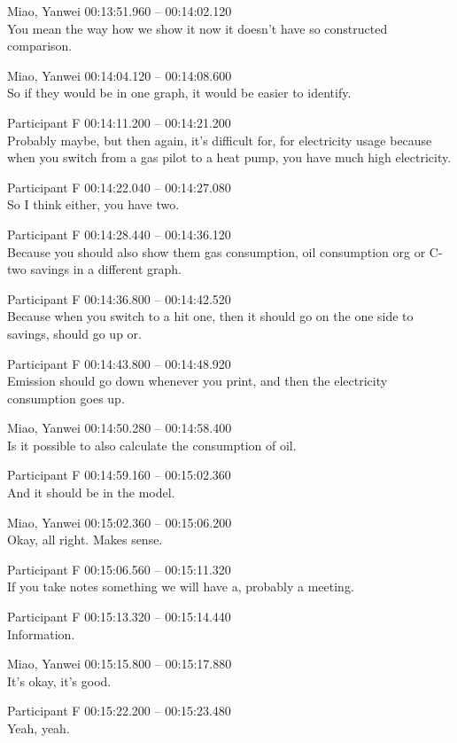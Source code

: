 {Miao, Yanwei 00:13:51.960 -- 00:14:02.120 \\
You mean the way how we show it now it doesn't have so constructed comparison.

Miao, Yanwei 00:14:04.120 -- 00:14:08.600 \\
So if they would be in one graph, it would be easier to identify.

Participant F 00:14:11.200 -- 00:14:21.200 \\
Probably maybe, but then again, it's difficult for, for electricity usage because when you switch from a gas pilot to a heat pump, you have much high electricity.

Participant F 00:14:22.040 -- 00:14:27.080 \\
So I think either, you have two.

Participant F 00:14:28.440 -- 00:14:36.120 \\
Because you should also show them gas consumption, oil consumption org or C- two savings in a different graph.

Participant F 00:14:36.800 -- 00:14:42.520 \\
Because when you switch to a hit one, then it should go on the one side to savings, should go up or.

Participant F 00:14:43.800 -- 00:14:48.920 \\
Emission should go down whenever you print, and then the electricity consumption goes up.

Miao, Yanwei 00:14:50.280 -- 00:14:58.400 \\
Is it possible to also calculate the consumption of oil.

Participant F 00:14:59.160 -- 00:15:02.360 \\
And it should be in the model.

Miao, Yanwei 00:15:02.360 -- 00:15:06.200 \\
Okay, all right. Makes sense.

Participant F 00:15:06.560 -- 00:15:11.320 \\
If you take notes something we will have a, probably a meeting.

Participant F 00:15:13.320 -- 00:15:14.440 \\
Information.

Miao, Yanwei 00:15:15.800 -- 00:15:17.880 \\
It's okay, it's good.

Participant F 00:15:22.200 -- 00:15:23.480 \\
Yeah, yeah.

}
